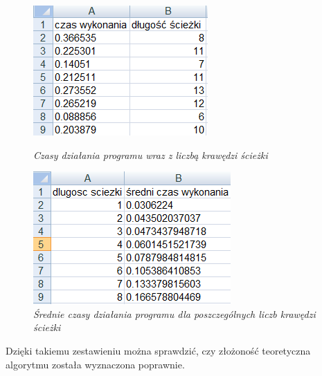 \documentclass[a4paper, 12pt]{article}
\begin{document}
\begin{figure}[ht]
\begin{minipage}[b]{0.41\linewidth}
\centering
\includegraphics[width=\textwidth]{tabela1.png}
\caption{\em Czasy działania programu wraz z liczbą krawędzi ścieżki}
\label{fig:tabela1}
\end{minipage}
\hspace{0.5cm}
\begin{minipage}[b]{0.45\linewidth}
\centering
\includegraphics[width=\textwidth]{tabela2.png}
\caption{\em Średnie czasy działania programu dla poszczególnych liczb krawędzi ścieżki}
\label{fig:tabela2}
\end{minipage}
\end{figure}

Dzięki takiemu zestawieniu można sprawdzić, czy złożoność teoretyczna algorytmu została wyznaczona poprawnie.
\end{document}
